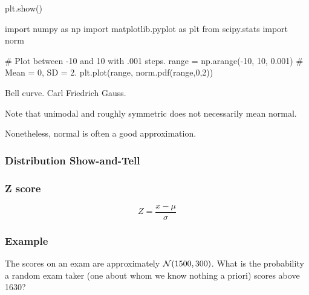 \documentclass[t]{beamer}
\begin{document}
\begin{frame}
{    plt.show()

    
    
    import numpy as np
    import matplotlib.pyplot as plt
    from scipy.stats import norm
    
    \# Plot between -10 and 10 with .001 steps.
    range = np.arange(-10, 10, 0.001)
    \# Mean = 0, SD = 2.
    plt.plot(range, norm.pdf(range,0,2))

    \bigskip

    Bell curve.  Carl Friedrich Gauss.
    
    Note that unimodal and roughly symmetric does not necessarily mean normal.
    
    Nonetheless, normal is often a good approximation.

  }
  
\end{frame}

\begin{frame}
  \frametitle{Distribution Show-and-Tell}

\end{frame}

\begin{frame}
  \frametitle{Z score}

  \vspace{1cm}
  
  \begin{displaymath}
    Z = \frac{x-\mu}{\sigma}
  \end{displaymath}
  
\end{frame}

\begin{frame}
  \frametitle{Example}

  The scores on an exam are approximately $\mathcal{N}(1500, 300)$.  What is
  the probability a random exam taker (one about whom we know nothing
  a priori) scores above 1630?

  
  
\end{frame}
\end{document}

